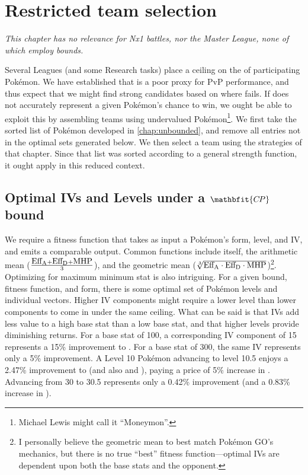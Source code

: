 \chapter{Restricted team selection\label{chap:bounded}}
\textit{This chapter has no relevance for Nx1 battles, nor the Master
  League, none of which employ \CP{} bounds.}
\bigskip

Several Leagues (and some Research tasks) place a ceiling on the \CP{} of
 participating Pokémon.
We have established that \CP{} is a poor proxy for PvP performance, and thus
 expect that we might find strong candidates based on where \CP{} fails.
If \CP{} does not accurately represent a given Pokémon's chance to win, we ought
 be able to exploit this by assembling teams using undervalued Pokémon\footnote{Michael Lewis might call it ``Moneymon''.}.
We first take the sorted list of Pokémon developed in \autoref{chap:unbounded},
 and remove all entries not in the optimal sets generated below.
We then select a team using the strategies of that chapter. Since
 that list was sorted according to a general strength function, it
 ought apply in this reduced context.

\section[Optimal IVs and Levels under a \CP{} bound]%
{Optimal IVs and Levels under a $\mathbfit{C\kern -1ptP}$\, bound}
We require a fitness function that takes as input a Pokémon's form, level, and IV,
  and emits a comparable output.
  Common functions include \CP{} itself, the arithmetic mean ($\frac{\mbox{$\mathrm{Eff_{A}}$} + \mbox{$\mathrm{Eff_{D}}$} + \mbox{$\mathrm{MHP}$}}{3}$),
  and the geometric mean ($\sqrt[3]{\mbox{$\mathrm{Eff_{A}}$} \cdot \mbox{$\mathrm{Eff_{D}}$} \cdot \mbox{$\mathrm{MHP}$}}$)\footnote{I personally believe the geometric mean to best match Pokémon GO's
  mechanics, but there is no true ``best'' fitness function---optimal IVs are
  dependent upon both the base stats and the opponent.}.
Optimizing for maximum minimum stat is also intriguing.
For a given \CP{} bound, fitness function, and form, there is some optimal set of Pokémon levels
 and individual vectors.
Higher IV components might require a lower level than lower components to
 come in under the same ceiling.
What can be said is that IVs add less value to a high base stat than a low
 base stat, and that higher levels provide diminishing returns.
For a base stat of 100, a corresponding IV component of 15 represents a
 15\% improvement to .
For a base stat of 300, the same IV represents only a 5\% improvement.
A Level 10 Pokémon advancing to level 10.5 enjoys a 2.47\% improvement to
  (and also  and ), paying a price of 5\% increase
 in \CP{}.
Advancing from 30 to 30.5 represents only a 0.42\% improvement (and a
 0.83\% increase in \CP{}).

